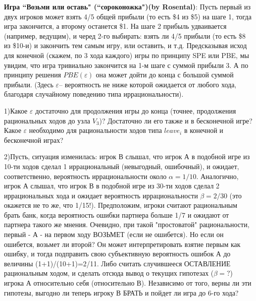 \documentclass[a4paper,12pt]{article}
\begin{document}
\begin{exmp}{\bf Игра ``Возьми или оставь" (``сороконожка")(by Rosental)}:\rm {}
Пусть первый из двух игроков может взять 4/5 общей прибыли
(то есть \$4 из \$5) на шаге 1, тогда игра закончится, а
второму останется \$1. На шаге 2 прибыль удваивается
(например, ведущим), и черед 2-го выбирать: взять ли 4/5
прибыли (то есть \$8 из \$10-и) и закончить тем самым игру,
или оставить, и т.д. Предсказывая исход для конечной
(скажем, по 3 хода каждого) игры по принципу SPE или PBE,
мы увидим, что игра тривиально закончится на 1-м шаге с
суммой прибыли 3. А по принципу решения $PBE(\varepsilon)$
она может дойти до конца с большой суммой прибыли. (Здесь
$\varepsilon$-- вероятность не ниже которой ожидается от
любого хода, благодаря случайному поведению типа
иррациональности).

1)Какое $\varepsilon$ достаточно для продолжения игры до
конца (точнее, продолжения рациональных ходов до узла
$V_3$)? Достаточно ли его также и в бесконечной игре? Какое
$\varepsilon$ необходимо для рациональности ходов типа
$leave_i$ в конечной и бесконечной играх?

2)Пусть, ситуация изменилась: игрок В слышал, что игрок А в
подобной игре из 10-ти ходов сделал 1 иррациональный
(невыгодный, ошибочный), и ожидает, соответственно,
вероятность иррациональности около $\alpha= 1/10$.
Аналогично, игрок А слышал, что игрок В в подобной игре из
30-ти ходов сделал 2 иррациональных хода и ожидает
вероятность иррациональности $\beta= 2/30$ (это окажется не
то же, что 1/15!). Предположим, игроки считают рациональным
брать банк, когда вероятность ошибки партнера больше 1/7 и
ожидают от партнера такого же мнения. Очевидно, при такой
"простоватой" рациональности, первый - А - на первом ходу
ВОЗЬМЕТ (если не ошибется). Но если он ошибется, возьмет ли
второй? Он может интерпретировать взятие первым как ошибку,
и тогда подправить свою субъективную вероятность ошибок А
до величины (1+1)/(10+1)=2/11. Либо считать случившееся
ОСТАВЛЕНИЕ рациональным ходом, и сделать отсюда вывод о
текущих гипотезах ($\beta=?$) игрока А относительно себя
(относительно В). Независимо от того, верны ли эти
гипотезы, выгодно ли теперь игроку В БРАТЬ и пойдет ли игра
до 6-го хода?


\end{exmp}
\end{document}
